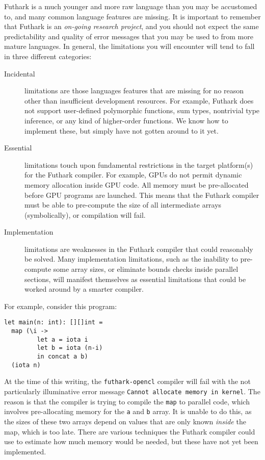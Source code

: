 \documentclass[oneside,11pt]{book}
\begin{document}
Futhark is a much younger and more raw language than you may be
accustomed to, and many common language features are missing.  It is
important to remember that Futhark is an \textit{on-going research
  project}, and you should not expect the same predictability and
quality of error messages that you may be used to from more mature
languages.  In general, the limitations you will encounter will tend
to fall in three different categories:

\begin{description}
\item[Incidental] limitations are those languages features that are
  missing for no reason other than insufficient development resources.
  For example, Futhark does not support user-defined polymorphic
  functions, sum types, nontrivial type inference, or any kind of
  higher-order functions.  We know how to implement these, but simply
  have not gotten around to it yet.

\item[Essential] limitations touch upon fundamental restrictions in
  the target platform(s) for the Futhark compiler.  For example, GPUs
  do not permit dynamic memory allocation inside GPU code.  All memory
  must be pre-allocated before GPU programs are launched.  This means
  that the Futhark compiler must be able to pre-compute the size of
  all intermediate arrays (symbolically), or compilation will fail.

\item[Implementation] limitations are weaknesses in the Futhark
  compiler that could reasonably be solved.  Many implementation
  limitations, such as the inability to pre-compute some array sizes,
  or eliminate bounds checks inside parallel sections, will manifest
  themselves as essential limitations that could be worked around by a
  smarter compiler.
\end{description}

For example, consider this program:

\begin{lstlisting}
let main(n: int): [][]int =
  map (\i ->
         let a = iota i
         let b = iota (n-i)
         in concat a b)
  (iota n)
\end{lstlisting}

At the time of this writing, the \texttt{futhark-opencl} compiler will
fail with the not particularly illuminative error message
\texttt{Cannot allocate memory in kernel}.  The reason is that the
compiler is trying to compile the \texttt{map} to parallel code, which
involves pre-allocating memory for the \texttt{a} and \texttt{b}
array.  It is unable to do this, as the sizes of these two arrays
depend on values that are only known \textit{inside} the map, which is
too late.  There are various techniques the Futhark compiler could use
to estimate how much memory would be needed, but these have not yet
been implemented.
\end{document}
